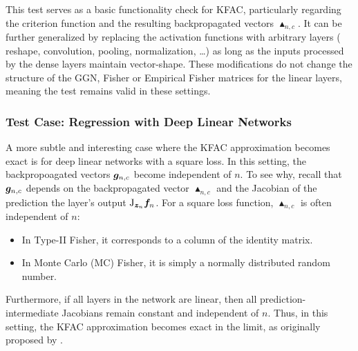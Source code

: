 This test serves as a basic functionality check for KFAC, particularly regarding the criterion function and the resulting backpropagated vectors $\blacktriangle_{n,c}$.
It can be further generalized by replacing the activation functions with arbitrary layers (\eg\,reshape, convolution, pooling, normalization, \dots) as long as the inputs processed by the dense layers maintain vector-shape.
These modifications do not change the structure of the GGN, Fisher or Empirical Fisher matrices for the linear layers, meaning the test remains valid in these settings.

\switchcolumn[1]
\switchcolumn[0]

\subsubsection{Test Case: Regression with Deep Linear Networks}

A more subtle and interesting case where the KFAC approximation becomes exact is for deep linear networks with a square loss.
In this setting, the backpropoagated vectors ${\bm{g}}_{n,c}$ become independent of $n$.
To see why, recall that ${\bm{g}}_{n,c}$ depends on the backpropagated vector $\blacktriangle_{n,c}$ and the Jacobian of the prediction \wrt the layer's output $\mathrm{J}_{{\bm{z}}_n} {\bm{f}}_n$.
For a square loss function, $\blacktriangle_{n,c}$ is often independent of $n$:
\begin{itemize}
\item In Type-II Fisher, it corresponds to a column of the identity matrix.
\item In Monte Carlo (MC) Fisher, it is simply a normally distributed random number.
\end{itemize}
Furthermore, if all layers in the network are linear, then all prediction-intermediate Jacobians remain constant and independent of $n$.
Thus, in this setting, the KFAC approximation becomes exact in the limit, as originally proposed by \cite{bernacchia2018exact}.

